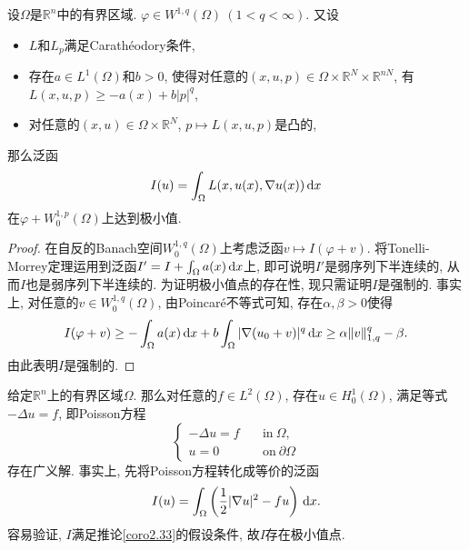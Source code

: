 \begin{corollary}[存在性]\label{coro2.33}
    设$\Omega$是$\mathbb{R}^n$中的有界区域. $\varphi \in W^{1, q}(\Omega)\ (1 < q < \infty)$.
    又设 
    \begin{itemize}
        \item $L$和$L_p$满足Carathéodory条件,
        \item 存在$a \in L^1(\Omega)$和$b > 0$, 使得对任意的$(x, u, p) \in \Omega \times \mathbb{R}^N \times \mathbb{R}^{nN}$, 有$L(x, u, p) \geq -a(x) + b|p|^q$,
        \item 对任意的$(x, u) \in \Omega \times \mathbb{R}^N$, $p \mapsto L(x, u, p)$是凸的,
    \end{itemize}
    那么泛函 
    \begin{equation*}
        I(u) = \int_{\Omega}L(x, u(x), \nabla u(x)) \,{\rm d}x
    \end{equation*}
    在$\varphi + W_0^{1, p}(\Omega)$上达到极小值.
    \begin{proof}
        在自反的Banach空间$W_0^{1, q}(\Omega)$上考虑泛函$v \mapsto I(\varphi + v)$.
        将Tonelli-Morrey定理运用到泛函$I' = I + \int_{\Omega}a(x) \,{\rm d}x$上, 即可说明$I'$是弱序列下半连续的, 从而$I$也是弱序列下半连续的.
        为证明极小值点的存在性, 现只需证明$I$是强制的. 事实上, 对任意的$v \in W_0^{1, q}(\Omega)$, 由Poincaré不等式可知, 存在$\alpha, \beta > 0$使得 
        \begin{equation*}
            I(\varphi + v) \geq -\int_{\Omega}a(x) \,{\rm d}x + b\int_{\Omega}|\nabla (u_0 + v)|^q \,{\rm d}x \geq \alpha\Vert v \Vert_{1, q}^q - \beta.
        \end{equation*}
        由此表明$I$是强制的.
    \end{proof}
\end{corollary}

\begin{example}
    给定$\mathbb{R}^n$上的有界区域$\Omega$. 那么对任意的$f \in L^2(\Omega)$, 存在$u \in H_0^1(\Omega)$, 满足等式$-\Delta u = f$, 即Poisson方程
    \begin{equation*}
        \begin{cases}
            -\Delta u = f \quad &\text{in}\ \Omega, \\ 
            u = 0 \quad &\text{on}\ \partial\Omega
        \end{cases}
    \end{equation*}
    存在广义解. 事实上, 先将Poisson方程转化成等价的泛函 
    \begin{equation*}
        I(u) = \int_{\Omega}\left(\frac{1}{2}|\nabla u|^2 - fu\right) \,{\rm d}x.
    \end{equation*}
    容易验证, $I$满足推论\ref{coro2.33}的假设条件, 故$I$存在极小值点.
\end{example}

